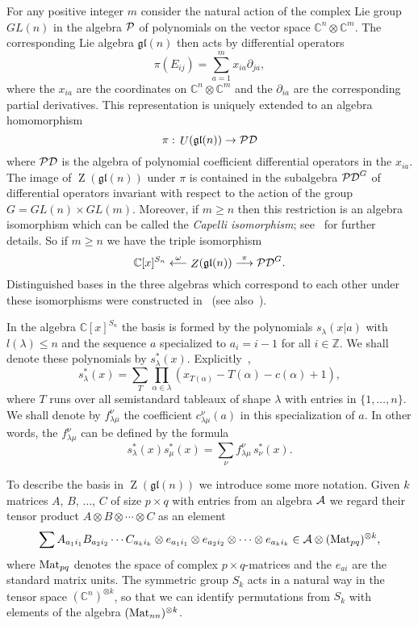\documentclass[titlepage,12pt]{article}
\newcommand{\0}{{\bf 0}}
\newcommand{\1}{{\bf 1}}
\newcommand{\2}{{\bf 2}}
\newcommand{\3}{{\bf 3}}
\newcommand{\4}{{\bf 4}}
\newcommand{\5}{{\bf 5}}
\newcommand{\6}{{\bf 6}}
\newcommand{\7}{{\bf 7}}
\newcommand{\8}{{\bf 8}}
\newcommand{\9}{{\bf 9}}
\newcommand{\cA}{{\cal A}}
\newcommand{\cP}{{\cal P}}
\newcommand{\cPD}{{\cal PD}}
\newcommand{\Mat}{\mathop{\rm Mat}\nolimits}
\newcommand{\U}{\mathop{U}}
\newcommand{\Z}{\mathop{Z}}
\newcommand{\C}{\mathbb{C}}
\newcommand{\ZZ}{\mathbb{Z}}
\newcommand{\gl}{\mathfrak{gl}}
\newcommand{\di}{\partial}
\newcommand{\ot}{\otimes}
\newcommand{\ts}{\,}
\begin{document}
For any positive integer $m$ consider the natural action
of the complex Lie group $GL(n)$ in the algebra $\cP$
of polynomials on the vector space $\C^n\ot\C^m$.
The corresponding Lie algebra $\gl(n)$ then acts by differential operators
$$
\pi(E_{ij})=\sum_{a=1}^m x_{ia}\di_{ja},
$$
where the $x_{ia}$ are the coordinates on $\C^n\ot\C^m$ and the 
$\di_{ia}$ are the corresponding partial derivatives.
This representation is uniquely extended to an algebra
homomorphism
$$
\pi:\ts \U(\gl(n))\to\cPD
$$
where $\cPD$ is the algebra of polynomial coefficient differential
operators in the $x_{ia}$. The image of
$\Z(\gl(n))$ under $\pi$ is contained in the subalgebra $\cPD^G$
of differential operators invariant with respect to the action
of the group $G=GL(n)\times GL(m)$. Moreover, if $m\geq n$
then this restriction is an algebra isomorphism which can be called
the {\it Capelli isomorphism\/}; see~\cite{how:rci,hu:cdd} for further
details.
So if $m\geq n$ we have the triple isomorphism
$$
\C[x]^{S_n}\stackrel{\omega}{\longleftarrow}\Z(\gl(n))
\stackrel{\pi}{\longrightarrow} \cPD^G.
$$
Distinguished bases in the three algebras which correspond to each
other under
these isomorphisms were constructed in~\cite{oko:qih} 
(see also~\cite{naz:yci,oko:ybw,mol:fss}).

In the algebra $\C[x]^{S_n}$ the basis is formed by the polynomials
$s_{\lambda}(x|a)$ with $l(\lambda)\leq n$ and the sequence $a$
specialized to $a_i=i-1$ for all $i\in\ZZ$. We shall denote these
polynomials by $s^*_{\lambda}(x)$.
Explicitly~\cite{bl:ncs},
$$
s^*_{\lambda}(x)=\sum_{T}\prod_{\alpha\in\lambda}
(x_{T(\alpha)}-T(\alpha)-c(\alpha)+1), %
$$
where $T$ runs over all semistandard tableaux of shape $\lambda$
with entries in $\{1,\dots,n\}$.
We shall denote by $f_{\lambda\mu}^{\nu}$ the coefficient
$c_{\lambda\mu}^{\nu}(a)$ in this specialization of $a$. In other words,
the $f_{\lambda\mu}^{\nu}$ can be defined by the formula
$$
s^*_{\lambda}(x)s^*_{\mu}(x)=\sum_{\nu}f_{\lambda\mu}^{\nu}\ts
s^*_{\nu}(x).
$$

To describe the basis in $\Z(\gl(n))$ we introduce some more notation.
Given $k$ matrices $A$, $B$, $\dots$, $C$ of size $p\times q$
with entries from an algebra $\cA$
we regard their tensor product $A\ot B\ot\cdots\ot C$
as an element
$$
\sum A_{a_1i_1}B_{a_2i_2}\cdots C_{a_ki_k}
\ot e_{a_1i_1}\ot e_{a_2i_2}\ot\cdots\ot e_{a_ki_k}\in\cA\ot
(\Mat_{pq})^{\ot k},
$$
where $\Mat_{pq}$ denotes the space of complex $p\times q$-matrices
and the $e_{ai}$ are the standard matrix units.
The symmetric group $S_k$ acts in a natural way in the tensor space
$(\C^n)^{\ot k}$,
so that we can identify permutations from $S_k$ with
elements of the algebra $(\Mat_{nn})^{\ot k}$.
\end{document}
